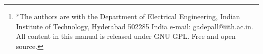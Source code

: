 \documentclass[journal,12pt,twocolumn]{IEEEtran}
\begin{document}
\author{Hemanth Kumar Desineedi and G V V Sharma$^{*}$%
\thanks{*The authors are with the Department
of Electrical Engineering, Indian Institute of Technology, Hyderabad
502285 India e-mail:  gadepall@iith.ac.in. All content in this manual is released under GNU GPL.  Free and open source.}%
}
% 
%



% 







\maketitle
\end{document}
